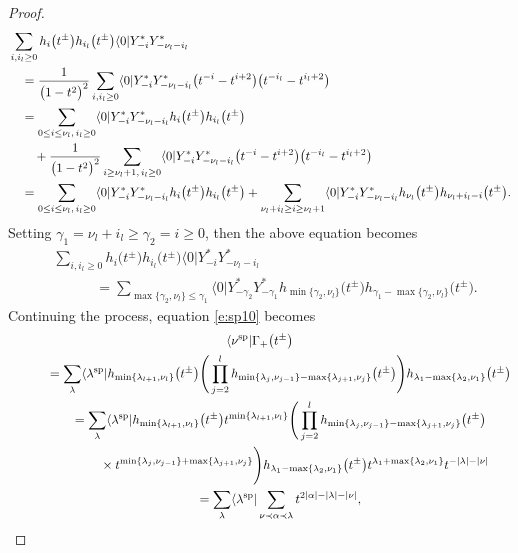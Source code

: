 \documentclass[10pt,a4paper]{amsart}
\numberwithin{equation}{section}
\begin{document}
\begin{proof}
\begin{align*}
\notag&\sum_{i,i_l\geq 0}h_i\big(t^{\pm}\big)h_{i_l}\big(t^{\pm}\big)\langle 0|Y^*_{-i}Y^*_{-\nu_l-i_l}\\
\notag&\quad{}=\frac{1}{\big(1-t^2\big)^2}\sum_{i,i_l\geq 0}\langle 0|Y^*_{-i}Y^*_{-\nu_l-i_l}\big(t^{-i}-t^{i+2}\big)\big(t^{-i_l}-t^{i_l+2}\big)\\
\notag&\quad{}=\sum_{0\leq i\leq \nu_l,\,i_l\geq 0}\langle 0|Y^*_{-i}Y^*_{-\nu_l-i_l}h_i\big(t^{\pm}\big)h_{i_l}\big(t^{\pm}\big)\\ \notag
&\qquad{}+\frac{1}{\big(1-t^2\big)^2}\sum_{i\geq \nu_l+1,\,i_l\geq 0}\langle 0|Y^*_{-i}Y^*_{-\nu_l-i_l}\big(t^{-i}-t^{i+2}\big)\big(t^{-i_l}-t^{i_l+2}\big)\\
\notag&\quad{}=\sum_{0\leq i\leq \nu_l,\,i_l\geq 0}\langle 0|Y^*_{-i}Y^*_{-\nu_l-i_l}h_i\big(t^{\pm}\big)h_{i_l}\big(t^{\pm}\big)+\sum_{\nu_l+i_l\geq i\geq \nu_l+1}\langle 0|Y^*_{-i}Y^*_{-\nu_l-i_l}h_{\nu_l}\big(t^{\pm}\big)h_{\nu_l+i_l-i}\big(t^{\pm}\big).
\end{align*}
Setting $\gamma_1=\nu_l+i_l\geq \gamma_2=i\geq 0$, then the above equation becomes
\begin{align*}
&\sum_{i,i_l\geq 0}h_i\big(t^{\pm}\big)h_{i_l}\big(t^{\pm}\big)\langle 0|Y^*_{-i}Y^*_{-\nu_l-i_l}\\
&\qquad\quad{}=\sum_{\max\{\gamma_2,\nu_l\}\leq \gamma_1}\langle 0|Y^*_{-\gamma_2}Y^*_{-\gamma_1}h_{\min\{\gamma_2,\nu_l\}}\big(t^{\pm}\big)h_{\gamma_1-\max\{\gamma_2,\nu_l\}}\big(t^{\pm}\big).
\end{align*}
Continuing the process, equation \eqref{e:sp10} becomes
\begin{gather*}
 \langle\nu^{\rm sp}|\Gamma_+\big(t^{\pm}\big)\\
 \qquad\quad{}=\sum_{\lambda}\langle\lambda^{\rm sp}|h_{\min\{\lambda_{l+1},\nu_l\}}\big(t^{\pm}\big)\Bigg(\prod^{l}_{j=2}h_{\min\{\lambda_j,\nu_{j-1}\}-\max\{\lambda_{j+1},\nu_j\}}\big(t^{\pm}\big)\Bigg)h_{\lambda_1-\max\{\lambda_2,\nu_1\}}\big(t^{\pm}\big)\\
 \qquad\quad{}=\sum_{\lambda}\langle\lambda^{\rm sp}|h_{\min\{\lambda_{l+1},\nu_l\}}\big(t^{\pm}\big)t^{\min\{\lambda_{l+1},\nu_l\}}\Bigg(\prod^{l}_{j=2}h_{\min\{\lambda_j,\nu_{j-1}\}-\max\{\lambda_{j+1},\nu_j\}}\big(t^{\pm}\big)\\
 \qquad\quad\hphantom{=\sum_{\lambda}}{}
\times t^{\min\{\lambda_j,\nu_{j-1}\}+\max\{\lambda_{j+1},\nu_j\}}\Bigg)h_{\lambda_1-\max\{\lambda_2,\nu_1\}}\big(t^{\pm}\big)t^{\lambda_1+\max\{\lambda_2,\nu_1\}} t^{-|\lambda|-|\nu|}\\ \notag
 \qquad\quad{}=\sum_{\lambda}\langle\lambda^{\rm sp}|\sum_{\nu\prec\alpha\prec\lambda}t^{2|\alpha|-|\lambda|-|\nu|},

\end{gather*}
\end{proof}
\end{document}
